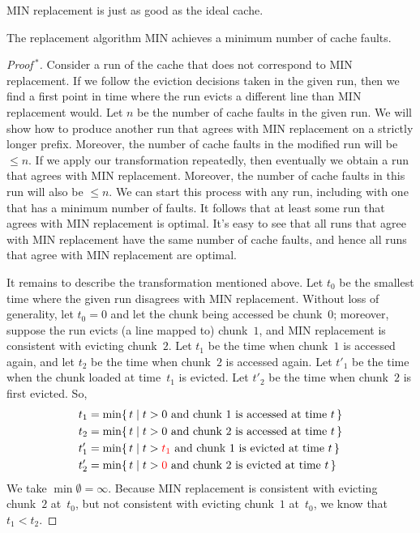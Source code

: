MIN replacement is just as good as the ideal cache.
\begin{theorem}\label{th:min-is-best}
The replacement algorithm MIN achieves a minimum number of cache faults.
\end{theorem}
\begin{proof}[Proof$\,{}^\ast$]
Consider a run of the cache that does not correspond to MIN replacement.
If we follow the eviction decisions taken in the given run,
  then we find a first point in time where the run evicts a different line
    than MIN replacement would.
Let $n$ be the number of cache faults in the given run.
We will show how to produce another run that agrees with MIN replacement
  on a strictly longer prefix.
Moreover, the number of cache faults in the modified run will be $\le n$.
If we apply our transformation repeatedly,
  then eventually we obtain a run that agrees with MIN replacement.
Moreover, the number of cache faults in this run will also be $\le n$.
We can start this process with any run,
  including with one that has a minimum number of faults.
It follows that at least some run that agrees with MIN replacement is optimal.
It's easy to see that all runs that agree with MIN replacement have the same
  number of cache faults,
  and hence all runs that agree with MIN replacement are optimal.

It remains to describe the transformation mentioned above.
Let $t_0$ be the smallest time where the given run disagrees with MIN replacement.
Without loss of generality,
  let $t_0=0$ and let the chunk being accessed be chunk~$0$;
  moreover, suppose the run evicts (a line mapped to) chunk~$1$,
  and MIN replacement is consistent with evicting chunk~$2$.
Let $t_1$ be the time when chunk~$1$ is accessed again,
  and let $t_2$ be the time when chunk~$2$ is accessed again.
Let $t'_1$ be the time when the chunk loaded at time~$t_1$ is evicted.
Let $t'_2$ be the time when chunk~$2$ is first evicted.
So,
\begin{align*}
  t_1 & = \min\{\,t\mid\text{$t>0$ and chunk~$1$ is accessed at time~$t$}\,\} \\
  t_2 & = \min\{\,t\mid\text{$t>0$ and chunk~$2$ is accessed at time~$t$}\,\} \\
  t'_1 &= \min\{\,t\mid\text{$t>{\color{red} t_1}$ and chunk~$1$ is evicted at time~$t$}\,\} \\
  t'_2 &= \min\{\,t\mid\text{$t>{\color{red} 0}$ and chunk~$2$ is evicted at time~$t$}\,\}
\end{align*}
We take $\min\emptyset=\infty$.
Because MIN replacement is consistent with evicting chunk~$2$ at~$t_0$,
  but not consistent with evicting chunk~$1$ at~$t_0$,
  we know that $t_1<t_2$.


\end{proof}
